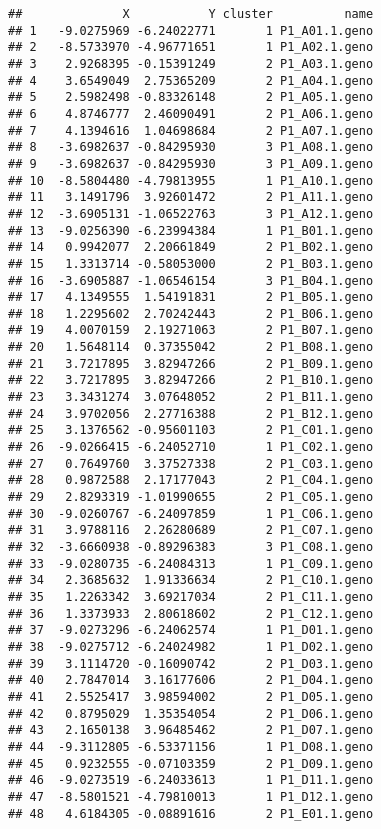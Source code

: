 \documentclass[]{article}
\begin{document}
\begin{verbatim}
##              X           Y cluster          name
## 1   -9.0275969 -6.24022771       1 P1_A01.1.geno
## 2   -8.5733970 -4.96771651       1 P1_A02.1.geno
## 3    2.9268395 -0.15391249       2 P1_A03.1.geno
## 4    3.6549049  2.75365209       2 P1_A04.1.geno
## 5    2.5982498 -0.83326148       2 P1_A05.1.geno
## 6    4.8746777  2.46090491       2 P1_A06.1.geno
## 7    4.1394616  1.04698684       2 P1_A07.1.geno
## 8   -3.6982637 -0.84295930       3 P1_A08.1.geno
## 9   -3.6982637 -0.84295930       3 P1_A09.1.geno
## 10  -8.5804480 -4.79813955       1 P1_A10.1.geno
## 11   3.1491796  3.92601472       2 P1_A11.1.geno
## 12  -3.6905131 -1.06522763       3 P1_A12.1.geno
## 13  -9.0256390 -6.23994384       1 P1_B01.1.geno
## 14   0.9942077  2.20661849       2 P1_B02.1.geno
## 15   1.3313714 -0.58053000       2 P1_B03.1.geno
## 16  -3.6905887 -1.06546154       3 P1_B04.1.geno
## 17   4.1349555  1.54191831       2 P1_B05.1.geno
## 18   1.2295602  2.70242443       2 P1_B06.1.geno
## 19   4.0070159  2.19271063       2 P1_B07.1.geno
## 20   1.5648114  0.37355042       2 P1_B08.1.geno
## 21   3.7217895  3.82947266       2 P1_B09.1.geno
## 22   3.7217895  3.82947266       2 P1_B10.1.geno
## 23   3.3431274  3.07648052       2 P1_B11.1.geno
## 24   3.9702056  2.27716388       2 P1_B12.1.geno
## 25   3.1376562 -0.95601103       2 P1_C01.1.geno
## 26  -9.0266415 -6.24052710       1 P1_C02.1.geno
## 27   0.7649760  3.37527338       2 P1_C03.1.geno
## 28   0.9872588  2.17177043       2 P1_C04.1.geno
## 29   2.8293319 -1.01990655       2 P1_C05.1.geno
## 30  -9.0260767 -6.24097859       1 P1_C06.1.geno
## 31   3.9788116  2.26280689       2 P1_C07.1.geno
## 32  -3.6660938 -0.89296383       3 P1_C08.1.geno
## 33  -9.0280735 -6.24084313       1 P1_C09.1.geno
## 34   2.3685632  1.91336634       2 P1_C10.1.geno
## 35   1.2263342  3.69217034       2 P1_C11.1.geno
## 36   1.3373933  2.80618602       2 P1_C12.1.geno
## 37  -9.0273296 -6.24062574       1 P1_D01.1.geno
## 38  -9.0275712 -6.24024982       1 P1_D02.1.geno
## 39   3.1114720 -0.16090742       2 P1_D03.1.geno
## 40   2.7847014  3.16177606       2 P1_D04.1.geno
## 41   2.5525417  3.98594002       2 P1_D05.1.geno
## 42   0.8795029  1.35354054       2 P1_D06.1.geno
## 43   2.1650138  3.96485462       2 P1_D07.1.geno
## 44  -9.3112805 -6.53371156       1 P1_D08.1.geno
## 45   0.9232555 -0.07103359       2 P1_D09.1.geno
## 46  -9.0273519 -6.24033613       1 P1_D11.1.geno
## 47  -8.5801521 -4.79810013       1 P1_D12.1.geno
## 48   4.6184305 -0.08891616       2 P1_E01.1.geno

\end{verbatim}
\end{document}
